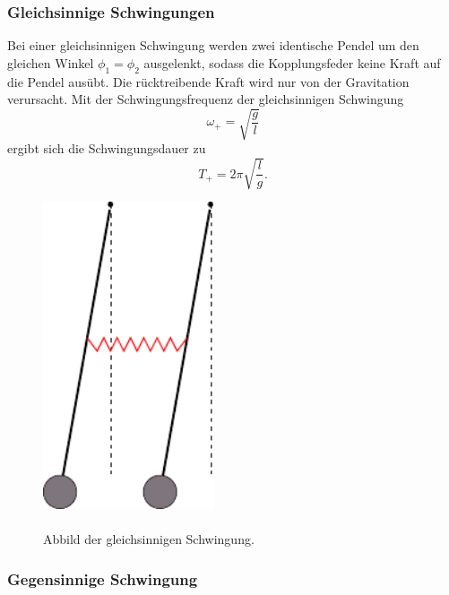 \subsubsection{Gleichsinnige Schwingungen}
\label{subsec:Gleich}
\begin{minipage}[t]{0.5\textwidth}
Bei einer gleichsinnigen Schwingung werden zwei identische Pendel um den gleichen Winkel $\phi_1 = \phi_2$ ausgelenkt, sodass die Kopplungsfeder keine Kraft auf die Pendel ausübt.
Die rücktreibende Kraft wird nur von der Gravitation verursacht.
Mit der Schwingungsfrequenz der gleichsinnigen Schwingung
\begin{equation}
    \omega_+ = \sqrt{\frac{g}{l}}
    \label{eqn:omega+}
\end{equation}
ergibt sich die Schwingungsdauer zu
\begin{equation}
    T_+ = 2 \pi \sqrt{\frac{l}{g}}.
    \label{eqn:T+}
\end{equation}
\end{minipage}
\begin{minipage}[t]{0.5\textwidth}
    \begin{figure}[H]
        \centering
        \includegraphics[width=0.45\textwidth]{Abbildungen/Abb_1.pdf}
\caption{\\Abbild der gleichsinnigen Schwingung. \cite{V106}}
        \label{fig:gleich}
      \end{figure}
\end{minipage}
\subsubsection{Gegensinnige Schwingung}

